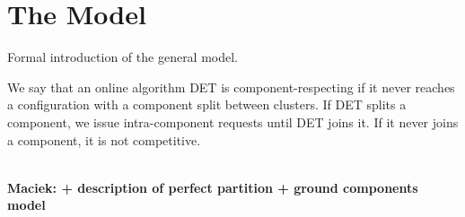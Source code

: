\documentclass[conference]{IEEEtran}
\newcommand\maciek[1]{\color{brown}\textbf{\\ Maciek: #1}\color{black}}
\begin{document}
\section{The Model}

Formal introduction of the general model.

 We say that an online algorithm DET is component-respecting if it never reaches a configuration with a component split between clusters.
 If DET splits a component, we issue intra-component requests until DET joins it.
 If it never joins a component, it is not competitive.

 \maciek{+ description of perfect partition + ground components model}




\appendix


	
\end{document}

